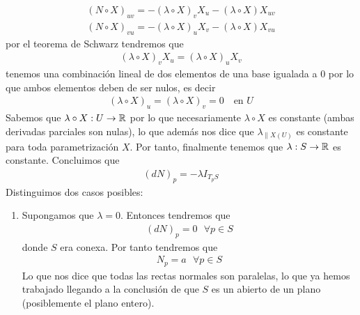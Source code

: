 \begin{ejercicio}
\begin{enumerate}
        \begin{gather*}
            (N \circ X)_{uv} = -(\lambda \circ X)_v X_u - (\lambda \circ X) X_{uv}\\
            (N \circ X)_{vu} = -(\lambda \circ X)_u X_v - (\lambda \circ X) X_{vu}
        \end{gather*}
        por el teorema de Schwarz tendremos que 
        \begin{gather*}
            (\lambda \circ X)_v X_u = (\lambda \circ X)_u X_v
        \end{gather*}
        tenemos una combinación lineal de dos elementos de una base igualada a $0$ por lo que ambos elementos deben de ser nulos, es decir
        \begin{gather*}
            (\lambda \circ X)_u = (\lambda \circ X)_v = 0 \ \ \ \text{ en }U
        \end{gather*}
        Sabemos que $\lambda \circ X : U \to \mathbb{R}$ por lo que necesariamente $\lambda \circ X$ es constante (ambas derivadas parciales son nulas), lo que además nos dice que $\lambda_{\|X(U)}$
        es constante para toda parametrización $X$. Por tanto, finalmente tenemos que $\lambda : S \to \mathbb{R}$ es constante. Concluimos que 
        \begin{gather*}
            (dN)_p = -\lambda I_{T_pS}
        \end{gather*}
        Distinguimos dos casos posibles:
        \begin{enumerate}
            \item Supongamos que $\lambda = 0$. Entonces tendremos que 
            \begin{gather*}
                (dN)_p = 0 \ \ \ \forall p\in S
            \end{gather*}
            donde $S$ era conexa. Por tanto tendremos que 
            \begin{gather*}
                N_p = a \ \ \ \forall p \in S
            \end{gather*}
            Lo que nos dice que todas las rectas normales son paralelas, lo que ya hemos trabajado llegando a la conclusión de que $S$ es un abierto de un plano (posiblemente el plano entero).


\end{enumerate}
\end{enumerate}
\end{ejercicio}
